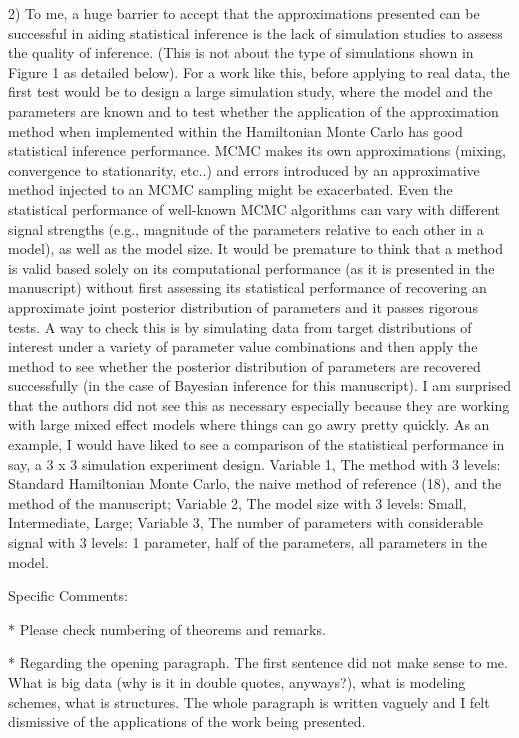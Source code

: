 \documentclass[12pt]{article}
\begin{document}
2) To me, a huge barrier to accept that the approximations presented can be successful in aiding statistical inference is the lack of simulation studies to assess the quality of inference. (This is not about the type of simulations shown in Figure 1 as detailed below). For a work like this, before applying to real data, the first test would be to design a large simulation study, where the model and the parameters are known and to test whether the application of the approximation method when implemented within the Hamiltonian Monte Carlo has good statistical inference performance. MCMC makes its own approximations (mixing, convergence to stationarity, etc..) and errors introduced by an approximative method injected to an MCMC sampling might be exacerbated. Even the statistical performance of well-known MCMC algorithms can vary with different signal strengths (e.g., magnitude of the parameters relative to each other in a model), as well as the model size. It would be premature to think that a method is valid based solely on its computational performance (as it is presented in the manuscript) without first assessing its statistical performance of recovering an approximate joint posterior distribution of parameters and it passes rigorous tests. A way to check this is by simulating data from target distributions of interest under a variety of parameter value combinations and then apply the method to see whether the posterior distribution of parameters are recovered successfully (in the case of Bayesian inference for this manuscript). I am surprised that the authors did not see this as necessary especially because they are working with large mixed effect models where things can go awry pretty quickly. As an example, I would have liked to see a comparison of the statistical performance in say, a 3 x 3 simulation experiment design. Variable 1, The method with 3 levels: Standard Hamiltonian Monte Carlo, the naive method of reference (18), and the method of the manuscript; Variable 2, The model size with 3 levels: Small, Intermediate, Large; Variable 3, The number of parameters with considerable signal with 3 levels: 1 parameter, half of the parameters, all parameters in the model. 


Specific Comments: 

* Please check numbering of theorems and remarks. 

* Regarding the opening paragraph. The first sentence did not make sense to me. What is big data (why is it in double quotes, anyways?), what is modeling schemes, what is structures. The whole paragraph is written vaguely and I felt dismissive of the applications of the work being presented. 
\end{document}
